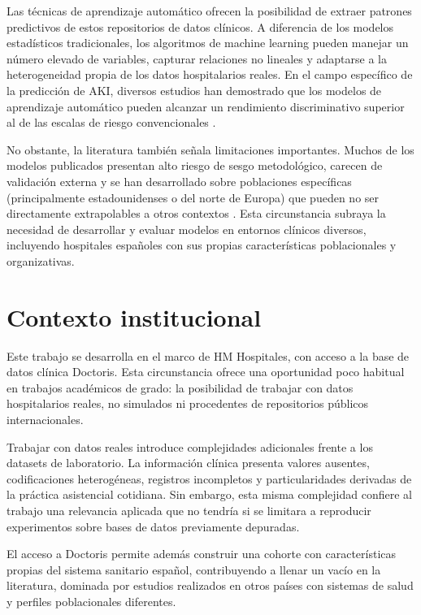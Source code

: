 \documentclass[12pt, a4paper, oneside]{report}
\begin{document}
Las técnicas de aprendizaje automático ofrecen la posibilidad de extraer patrones predictivos de estos repositorios de datos clínicos. A diferencia de los modelos estadísticos tradicionales, los algoritmos de machine learning pueden manejar un número elevado de variables, capturar relaciones no lineales y adaptarse a la heterogeneidad propia de los datos hospitalarios reales. En el campo específico de la predicción de AKI, diversos estudios han demostrado que los modelos de aprendizaje automático pueden alcanzar un rendimiento discriminativo superior al de las escalas de riesgo convencionales \parencite{tomasev2019nature, churpek2020validation, rank2022mlaki}.

No obstante, la literatura también señala limitaciones importantes. Muchos de los modelos publicados presentan alto riesgo de sesgo metodológico, carecen de validación externa y se han desarrollado sobre poblaciones específicas (principalmente estadounidenses o del norte de Europa) que pueden no ser directamente extrapolables a otros contextos \parencite{shi2025aiaki}. Esta circunstancia subraya la necesidad de desarrollar y evaluar modelos en entornos clínicos diversos, incluyendo hospitales españoles con sus propias características poblacionales y organizativas.

\section{Contexto institucional}
\label{sec:institucional}
Este trabajo se desarrolla en el marco de HM Hospitales, con acceso a la base de datos clínica Doctoris. Esta circunstancia ofrece una oportunidad poco habitual en trabajos académicos de grado: la posibilidad de trabajar con datos hospitalarios reales, no simulados ni procedentes de repositorios públicos internacionales.

Trabajar con datos reales introduce complejidades adicionales frente a los datasets de laboratorio. La información clínica presenta valores ausentes, codificaciones heterogéneas, registros incompletos y particularidades derivadas de la práctica asistencial cotidiana. Sin embargo, esta misma complejidad confiere al trabajo una relevancia aplicada que no tendría si se limitara a reproducir experimentos sobre bases de datos previamente depuradas.

El acceso a Doctoris permite además construir una cohorte con características propias del sistema sanitario español, contribuyendo a llenar un vacío en la literatura, dominada por estudios realizados en otros países con sistemas de salud y perfiles poblacionales diferentes.
\end{document}
